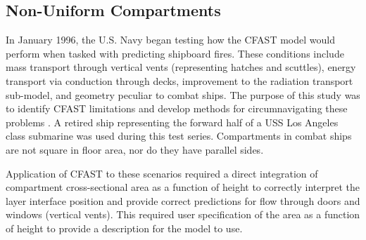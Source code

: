 \subsection{Non-Uniform Compartments}

In January 1996, the U.S. Navy began testing how the CFAST model would perform when tasked with predicting shipboard fires. These conditions include mass transport through vertical vents (representing hatches and scuttles), energy transport via conduction through decks, improvement to the radiation transport sub-model, and geometry peculiar to combat ships. The purpose of this study was to identify CFAST limitations and develop methods for circumnavigating these problems \cite{Hoover:2001}. A retired ship representing the forward half of a {USS} Los Angeles class submarine was used during this test series. Compartments in combat ships are not square in floor area, nor do they have parallel sides.

Application of CFAST to these scenarios required a direct integration of compartment cross-sectional area as a function of height to correctly interpret the layer interface position and provide correct predictions for flow through doors and windows (vertical vents). This required user specification of the area as a function of height to provide a description for the model to use.
